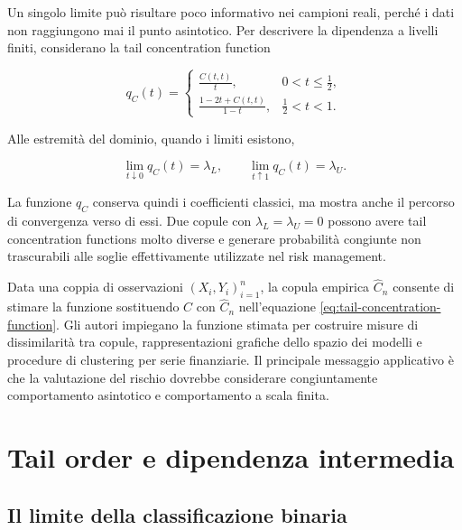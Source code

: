 \documentclass[12pt,a4paper,oneside]{book}
\begin{document}
Un singolo limite può risultare poco informativo nei campioni reali, perché i
dati non raggiungono mai il punto asintotico. Per descrivere la dipendenza a
livelli finiti, \textcite{duranteEtAl2015} considerano la tail concentration
function

\begin{equation}
    q_C(t)=
    \begin{cases}
        \displaystyle \frac{C(t,t)}{t},
        & 0<t\leq \tfrac{1}{2},\\[8pt]
        \displaystyle \frac{1-2t+C(t,t)}{1-t},
        & \tfrac{1}{2}<t<1.
    \end{cases}
    \label{eq:tail-concentration-function}
\end{equation}

Alle estremità del dominio, quando i limiti esistono,

\begin{equation}
    \lim_{t\downarrow 0}q_C(t)=\lambda_L,
    \qquad
    \lim_{t\uparrow 1}q_C(t)=\lambda_U.
\end{equation}

La funzione $q_C$ conserva quindi i coefficienti classici, ma mostra anche il
percorso di convergenza verso di essi. Due copule con
$\lambda_L=\lambda_U=0$ possono avere tail concentration functions molto
diverse e generare probabilità congiunte non trascurabili alle soglie
effettivamente utilizzate nel risk management.

Data una coppia di osservazioni $(X_i,Y_i)_{i=1}^n$, la copula empirica
$\widehat C_n$ consente di stimare la funzione sostituendo $C$ con
$\widehat C_n$ nell'equazione \eqref{eq:tail-concentration-function}. Gli
autori impiegano la funzione stimata per costruire misure di dissimilarità tra
copule, rappresentazioni grafiche dello spazio dei modelli e procedure di
clustering per serie finanziarie. Il principale messaggio applicativo è che
la valutazione del rischio dovrebbe considerare congiuntamente comportamento
asintotico e comportamento a scala finita.

\section{Tail order e dipendenza intermedia}

\subsection{Il limite della classificazione binaria}
\end{document}
